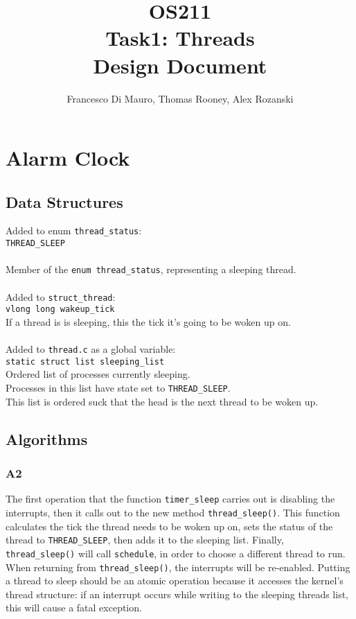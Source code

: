 \documentclass[a4wide, 11pt]{article}
\newcommand{\tab}{\hspace*{2em}}
\begin{document}
\title{OS211 \\ Task1: Threads \\ Design Document}
\author{Francesco Di Mauro, Thomas Rooney, Alex Rozanski}
\maketitle


\section{Alarm Clock}
\subsection{Data Structures}

Added to enum \texttt{thread\_status}: \\
\tab \tab \texttt{THREAD\_SLEEP} \\ \\
\tab \tab Member of the \texttt{enum thread\_status}, representing a sleeping thread.
\\\\
Added to \texttt{struct\_thread}: \\
\tab\tab \texttt{vlong long wakeup\_tick} \\
\tab\tab If a thread is is sleeping, this the tick it's going to be woken up on.
\\\\
Added to \texttt{thread.c} as a global variable: \\
\tab\tab \texttt{static struct list sleeping\_list} \\
\tab\tab Ordered list of processes currently sleeping.\\ 
\tab\tab Processes in this list 
   have state set to \texttt{THREAD\_SLEEP}. \\
\tab\tab This list is ordered suck that the head
   is the next thread to be woken up.

\subsection{Algorithms}
\subsubsection{A2}
The first operation that the function \texttt{timer\_sleep} carries out is disabling the interrupts, then it calls out to the new method \texttt{thread\_sleep()}. This function calculates the tick the thread needs to be woken up on, sets the status of the thread to \texttt{THREAD\_SLEEP}, then adds it to the sleeping list. Finally, \texttt{thread\_sleep()} will call \texttt{schedule}, in order to choose a different thread to run. When returning from \texttt{thread\_sleep()}, the interrupts will be re-enabled. Putting a thread to sleep should be an atomic operation because it accesses the kernel's thread structure: if an interrupt occurs while writing to the sleeping threads list, this will cause a fatal exception. 
\end{document}
